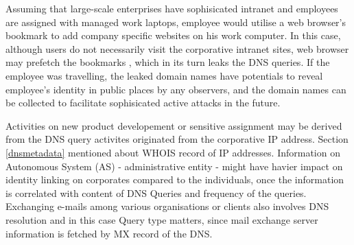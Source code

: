 Assuming that large-scale enterprises have sophisicated intranet and employees are assigned with managed work laptops, employee would utilise a web browser's bookmark to add company specific websites on his work computer. In this case, although users do not necessarily visit the corporative intranet sites, web browser may prefetch the bookmarks \cite{firefox-autocomplete-url, chrome-dns-prefectching}, which in its turn leaks the DNS queries. If the employee was travelling, the leaked domain names have potentials to reveal employee's identity in public places by any observers, and the domain names can be collected to facilitate sophisicated active attacks in the future.

Activities on new product developement or sensitive assignment may be derived from the DNS query activites originated from the corporative IP address. Section \ref{dnsmetadata} mentioned about WHOIS record of IP addresses. Information on Autonomous System (AS) - administrative entity - might have havier impact on identity linking on corporates compared to the individuals, once the information is correlated with content of DNS Queries and frequency of the queries. Exchanging e-mails among various organisations or clients also involves DNS resolution and in this case Query type matters, since mail exchange server information is fetched by MX record of the DNS.
